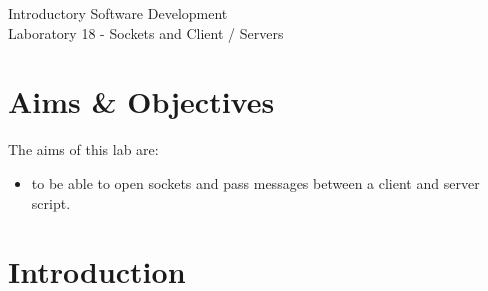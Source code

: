 \documentclass[12pt,oneside]{cttutorial}
\begin{document}
\tutorialextra{}


 

\newcommand{\xkcd}[2]{
	\begin{center}
	\texttt{[image: ../../Figures/png/\#1]}
	\newline
	\url{http://xkcd.com/#2}
	\end{center}
	\bigskip
}

\newcommand{\alert}[1]
{\marginpar
  {\makebox[0 pt][l]
    {\texttt{[image: ../../Figures/png/warning.png]}
  }
  \parbox{2 cm}{{\sffamily \bfseries \tiny #1}}}}


\renewcommand{\baselinestretch}{1.5}
\textwidth=15cm

\newcommand{\I}{j}

\begin{center}
\begin{bfseries}
Introductory Software Development\\Laboratory 18 - Sockets and Client / Servers
\end{bfseries}
\end{center}

\section{Aims \& Objectives}

The aims of this lab are:

\begin{itemize}
\item to be able to open sockets and pass messages between a client and server script.
\end{itemize}

\section{Introduction}
\end{document}
